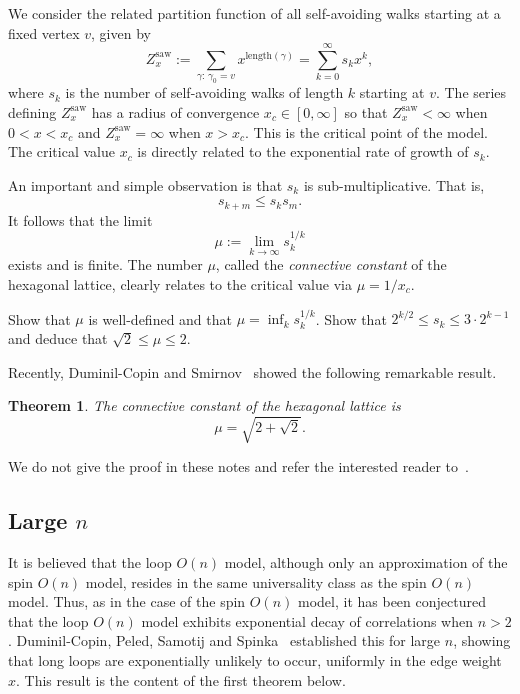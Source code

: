 \documentclass[12pt,reqno]{article}
\newtheorem{theorem}{Theorem}[section]
\begin{document}
We consider the related partition function of all self-avoiding walks starting at a fixed vertex $v$, given by
\[ Z_x^{\text{saw}} := \sum_{\gamma:\,\gamma_0=v} x^{\text{length}(\gamma)} = \sum_{k=0}^\infty s_k x^k ,\]
where $s_k$ is the number of self-avoiding walks of length $k$ starting at $v$. The series defining $Z_x^{\text{saw}}$ has a radius of convergence $x_c \in [0,\infty]$ so that $Z_x^{\text{saw}}<\infty$ when $0<x<x_c$ and $Z_x^{\text{saw}}=\infty$ when $x>x_c$. This is the critical point of the model. The critical value $x_c$ is directly related to the exponential rate of growth of $s_k$.

An important and simple observation is that $s_k$ is sub-multiplicative. That is,
\[ s_{k+m} \le s_k s_m .\]
It follows that the limit
\[ \mu := \lim_{k \to \infty} s_k^{1/k} \]
exists and is finite. The number $\mu$, called the \emph{connective constant} of the hexagonal lattice, clearly relates to the critical value via $\mu = 1/x_c$.


\medbreak
{}
Show that $\mu$ is well-defined and that $\mu = \inf_k s_k^{1/k}$.
\medbreak
{}
Show that $2^{k/2} \le s_k \le 3 \cdot 2^{k-1}$ and deduce that $\sqrt{2} \le \mu \le 2$.
\medbreak

Recently, Duminil-Copin and Smirnov~\cite{DumSmi12} showed the following remarkable result.

\begin{theorem}
The connective constant of the hexagonal lattice is
\[ \mu = \sqrt{2 + \sqrt{2}} .\]
\end{theorem}

We do not give the proof in these notes and refer the interested reader to~\cite{DumSmi12}.


\subsection{Large $n$}
\label{sec:large-n}

It is believed that the loop $O(n)$ model, although only an
approximation of the spin $O(n)$ model, resides in the same
universality class as the spin $O(n)$ model. Thus, as in the case of
the spin $O(n)$ model, it has been conjectured that the loop $O(n)$
model exhibits exponential decay of correlations when $n>2$. Duminil-Copin, Peled, Samotij and
Spinka~\cite{DCPSS14} established this for large $n$, showing
that long loops are exponentially unlikely to occur, uniformly in
the edge weight $x$. This result is the content of the first
theorem below.
\end{document}
